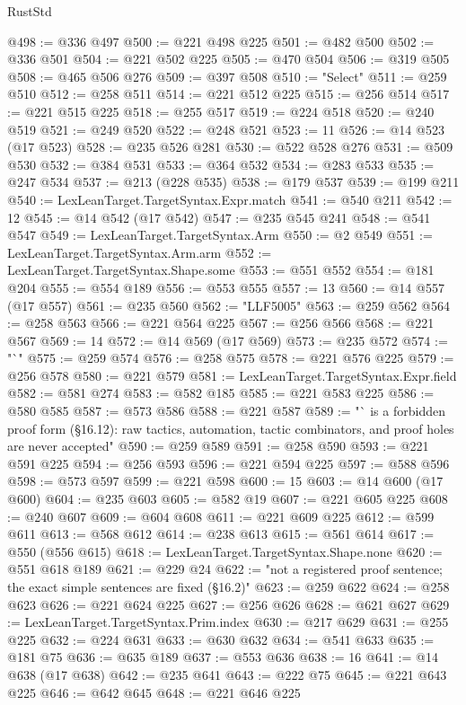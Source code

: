 \begin{lexlean}{RustStd}
\begin{coremodule}
@498 := @336 @497
@500 := @221 @498 @225
@501 := @482 @500
@502 := @336 @501
@504 := @221 @502 @225
@505 := @470 @504
@506 := @319 @505
@508 := @465 @506 @276
@509 := @397 @508
@510 := "Select"
@511 := @259 @510
@512 := @258 @511
@514 := @221 @512 @225
@515 := @256 @514
@517 := @221 @515 @225
@518 := @255 @517
@519 := @224 @518
@520 := @240 @519
@521 := @249 @520
@522 := @248 @521
@523 := 11
@526 := @14 @523 (@17 @523)
@528 := @235 @526 @281
@530 := @522 @528 @276
@531 := @509 @530
@532 := @384 @531
@533 := @364 @532
@534 := @283 @533
@535 := @247 @534
@537 := @213 (@228 @535)
@538 := @179 @537
@539 := @199 @211
@540 := LexLeanTarget.TargetSyntax.Expr.match
@541 := @540 @211
@542 := 12
@545 := @14 @542 (@17 @542)
@547 := @235 @545 @241
@548 := @541 @547
@549 := LexLeanTarget.TargetSyntax.Arm
@550 := @2 @549
@551 := LexLeanTarget.TargetSyntax.Arm.arm
@552 := LexLeanTarget.TargetSyntax.Shape.some
@553 := @551 @552
@554 := @181 @204
@555 := @554 @189
@556 := @553 @555
@557 := 13
@560 := @14 @557 (@17 @557)
@561 := @235 @560
@562 := "LLF5005"
@563 := @259 @562
@564 := @258 @563
@566 := @221 @564 @225
@567 := @256 @566
@568 := @221 @567
@569 := 14
@572 := @14 @569 (@17 @569)
@573 := @235 @572
@574 := "`"
@575 := @259 @574
@576 := @258 @575
@578 := @221 @576 @225
@579 := @256 @578
@580 := @221 @579
@581 := LexLeanTarget.TargetSyntax.Expr.field
@582 := @581 @274
@583 := @582 @185
@585 := @221 @583 @225
@586 := @580 @585
@587 := @573 @586
@588 := @221 @587
@589 := "` is a forbidden proof form (§16.12): raw tactics, automation, tactic combinators, and proof holes are never accepted"
@590 := @259 @589
@591 := @258 @590
@593 := @221 @591 @225
@594 := @256 @593
@596 := @221 @594 @225
@597 := @588 @596
@598 := @573 @597
@599 := @221 @598
@600 := 15
@603 := @14 @600 (@17 @600)
@604 := @235 @603
@605 := @582 @19
@607 := @221 @605 @225
@608 := @240 @607
@609 := @604 @608
@611 := @221 @609 @225
@612 := @599 @611
@613 := @568 @612
@614 := @238 @613
@615 := @561 @614
@617 := @550 (@556 @615)
@618 := LexLeanTarget.TargetSyntax.Shape.none
@620 := @551 @618 @189
@621 := @229 @24
@622 := "not a registered proof sentence; the exact simple sentences are fixed (§16.2)"
@623 := @259 @622
@624 := @258 @623
@626 := @221 @624 @225
@627 := @256 @626
@628 := @621 @627
@629 := LexLeanTarget.TargetSyntax.Prim.index
@630 := @217 @629
@631 := @255 @225
@632 := @224 @631
@633 := @630 @632
@634 := @541 @633
@635 := @181 @75
@636 := @635 @189
@637 := @553 @636
@638 := 16
@641 := @14 @638 (@17 @638)
@642 := @235 @641
@643 := @222 @75
@645 := @221 @643 @225
@646 := @642 @645
@648 := @221 @646 @225

\end{coremodule}
\end{lexlean}
